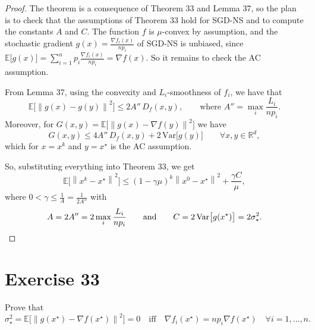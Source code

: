 \documentclass[11pt,a4paper]{article}
\newcommand{\R}{\mathbb{R}}
\newcommand{\E}{\mathbb{E}}
\newcommand{\norm}[1]{\left\| #1 \right\|}
\newcommand{\xs}{x^\star}
\begin{document}
\begin{proof}
The theorem is a consequence of Theorem 33 and Lemma 37, so the plan is to check that the
assumptions of Theorem 33 hold for SGD-NS and to compute the constants $A$ and $C$.
The function $f$ is $\mu$-convex by assumption, and the stochastic gradient
$g(x) = \frac{\nabla f_i(x)}{np_i}$ of SGD-NS is unbiased, since
$\E\bigl[g(x)\bigr] = \sum_{i=1}^n p_i \frac{\nabla f_i(x)}{np_i} = \nabla f(x)$.
So it remains to check the AC assumption.

From Lemma 37, using the convexity and $L_i$-smoothness of $f_i$, we have that
\[
  \E\bigl[\norm{g(x) - g(y)}^2\bigr] \le 2A''\,D_f(x,y), \qquad \text{where } A'' = \max_i \frac{L_i}{np_i}.
\]
Moreover, for $G(x,y) = \E\bigl[\norm{g(x) - \nabla f(y)}^2\bigr]$ we have
\[
  G(x,y) \le 4A''\,D_f(x,y) + 2\,\mathrm{Var}\bigl[g(y)\bigr] \qquad \forall x, y \in \R^d ,
\]
which for $x = x^k$ and $y = \xs$ is the AC assumption.

So, substituting everything into Theorem 33, we get
\[
  \E\bigl[\norm{x^k - \xs}^2\bigr] \le (1-\gamma\mu)^k\norm{x^0 - \xs}^2 + \frac{\gamma C}{\mu},
\]
where $0 < \gamma \le \frac{1}{A} = \frac{1}{2A''}$ with
\[
  A = 2A'' = 2\max_i \frac{L_i}{np_i} \qquad \text{and} \qquad C = 2\,\mathrm{Var}\bigl[g(\xs)\bigr] = 2\sigma_\star^2 . \qedhere
\]
\end{proof}

\section*{Exercise 33}

Prove that
\[
  \sigma_\star^2 = \E\bigl[\norm{g(\xs) - \nabla f(\xs)}^2\bigr] = 0
  \quad\text{iff}\quad \nabla f_i(\xs) = np_i\nabla f(\xs) \quad \forall i = 1,\dots,n.
\]
\end{document}
